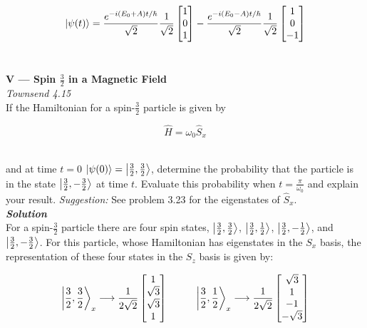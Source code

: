 \documentclass[14pt]{extarticle}
\newcommand{\bfit}[1]{\textbf{\textit{#1}}}
\begin{document}
$$
\ket{\psi(t)} =  \frac{e^{-i(E_0 + A)t/\hbar}}{\sqrt 2} \frac{1}{\sqrt 2} 
\begin{bmatrix}
        1 \\ 0 \\ 1
\end{bmatrix} - 
\frac{e^{-i(E_0 -A)t/\hbar}}{\sqrt 2} \frac{1}{\sqrt 2} 
\begin{bmatrix}
        1 \\ 0 \\ -1
\end{bmatrix}
$$ \ 







\hrulefill 

\hfill 

{\bf \LARGE V --- Spin $\frac 32$ in a Magnetic Field} \\ 

{\it Townsend 4.15} \\  
If the Hamiltonian for a spin-$\frac 32$ particle is given by

$$\hat H = \omega_0 \hat S_x$$ \ 

and at time $t=0$ $\ket{\psi(0)} = \ket{\frac 32, \frac 32}$, determine the probability that the particle is in the state $\ket{\frac 32, -\frac 32}$ at time $t$. Evaluate this probability when $t = \frac{\pi}{\omega_0}$ and explain your result. {\it Suggestion:} See problem 3.23 for the eigenstates of $\hat S_x$. \\ 

{\bfit{Solution}} \\ 
For a spin-$\frac 32$ particle there are four spin states, $\ket{\frac 32, \frac 32}$, $\ket{\frac 32, \frac 12}$, $\ket{\frac 32, -\frac 12}$, and $\ket{\frac 32, -\frac 32}$. For this particle, whose Hamiltonian has eigenstates in the $S_x$ basis, the representation of these four states in the $S_z$ basis is given by:

$$
\ket{\frac 32 , \frac 32}_x \longrightarrow \frac{1}{2\sqrt 2}
\begin{bmatrix}
        1 \\
        \sqrt 3 \\
        \sqrt 3 \\
        1
\end{bmatrix}
\hspace{1cm}
\ket{\frac 32 , \frac 12}_x \longrightarrow \frac{1}{2\sqrt 2}
\begin{bmatrix}
        \sqrt 3 \\
        1 \\
        -1 \\
        -\sqrt 3
\end{bmatrix}
$$
\end{document}
